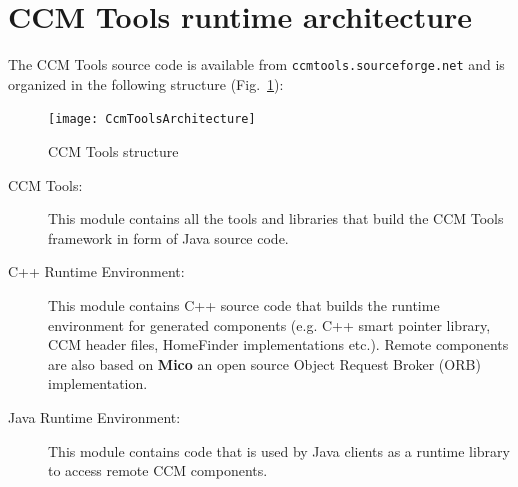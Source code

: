 \section{CCM Tools runtime architecture}

The CCM Tools source code is available from {\tt ccmtools.sourceforge.net}
and is organized in the following structure (Fig.~\ref{ccmtools-structure}):

\begin{figure}[htbp]
    \begin{center}
        \texttt{[image: CcmToolsArchitecture]}
        \caption{CCM Tools structure}
        \label{ccmtools-structure}
    \end{center}
\end{figure}

\begin{description}
\item [CCM Tools:]
This module contains all the tools and libraries that build the CCM Tools 
framework in form of Java source code.

\item [C++ Runtime Environment:]
This module contains C++ source code that builds the runtime environment for
generated components (e.g. C++ smart pointer library, CCM header files, 
HomeFinder implementations etc.).
Remote components are also based on {\bf Mico} \cite{MicoORB} an open source 
Object Request Broker (ORB) implementation.


\item [Java Runtime Environment:]
This module contains code that is used by Java clients
as a runtime library to access remote CCM components.

\end{description}

\newpage


